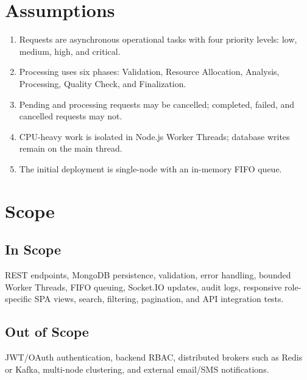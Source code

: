 \documentclass[11pt,a4paper]{article}
\begin{document}
\section{Assumptions}
\begin{enumerate}
\item Requests are asynchronous operational tasks with four priority levels: low, medium, high, and critical.
\item Processing uses six phases: Validation, Resource Allocation, Analysis, Processing, Quality Check, and Finalization.
\item Pending and processing requests may be cancelled; completed, failed, and cancelled requests may not.
\item CPU-heavy work is isolated in Node.js Worker Threads; database writes remain on the main thread.
\item The initial deployment is single-node with an in-memory FIFO queue.
\end{enumerate}

\section{Scope}
\subsection*{In Scope}
REST endpoints, MongoDB persistence, validation, error handling, bounded Worker Threads, FIFO queuing, Socket.IO updates, audit logs, responsive role-specific SPA views, search, filtering, pagination, and API integration tests.
\subsection*{Out of Scope}
JWT/OAuth authentication, backend RBAC, distributed brokers such as Redis or Kafka, multi-node clustering, and external email/SMS notifications.
\end{document}
